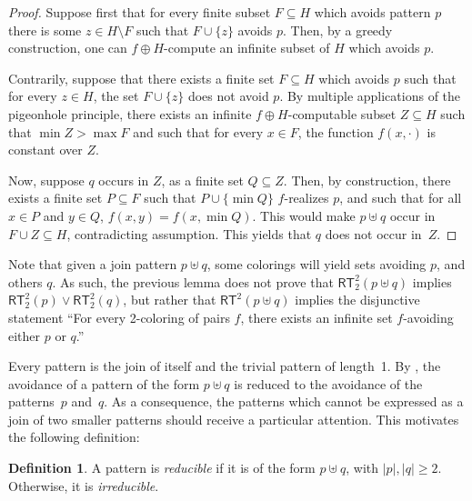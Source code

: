 \documentclass{article}
\newcommand{\RT}[0]{\mathsf{RT}}
\newcommand{\NN}[0]{\mathbb{N}}
\def\qt#1{``#1''}%
\def\NN{\mathbb{N}}
\def\qt#1{``#1''}%
\numberwithin{theorem}{section}
\newtheorem{lemma}[theorem]{Lemma}
\theoremstyle{definition}
\newtheorem{definition}[theorem]{Definition}
\begin{document}
\begin{proof}
Suppose first that for every finite subset $F \subseteq H$ which avoids pattern $p$ there is some $z \in H \setminus F$ such that $F \cup \{ z \}$ avoids $p$. Then, by a greedy construction, one can $f \oplus H$-compute an infinite subset of $H$ which avoids $p$.

Contrarily, suppose that there exists a finite set $F \subseteq H$ which avoids $p$ such that for every $z \in H$, the set $F \cup \{z \}$ does not avoid $p$. By multiple applications of the pigeonhole principle, there exists an infinite $f \oplus H$-computable subset $Z \subseteq H$ such that $\min Z > \max F$ and such that for every $x \in F$, the function $f(x, \cdot)$ is constant over $Z$.

Now, suppose $q$ occurs in $Z$, as a finite set $Q \subseteq Z$. Then, by construction, there exists a finite set $P \subseteq F$ such that $P \cup \{ \min Q \}$ $f$-realizes $p$, and such that for all $x \in P$ and $y \in Q$, $f(x,y) = f(x, \min Q)$. This would make $p \uplus q$ occur in $F \cup Z \subseteq H$, contradicting assumption. This yields that $q$ does not occur in~$Z$.
\end{proof}

Note that given a join pattern $p \uplus q$, some colorings will yield sets avoiding $p$, and others $q$. As such, the previous lemma does not prove that $\RT_2^2(p \uplus q)$ implies $\RT_2^2(p) \lor \RT_2^2(q)$, but rather that $\RT^2(p \uplus q)$ implies the disjunctive statement \qt{For every 2-coloring of pairs $f$, there exists an infinite set $f$-avoiding either $p$ or $q$.}

Every pattern is the join of itself and the trivial pattern of length~1. By , the avoidance of a pattern of the form $p \uplus q$ is reduced to the avoidance of the patterns~$p$ and~$q$. As a consequence, the patterns which cannot be expressed as a join of two smaller patterns should receive a particular attention. This motivates the following definition:

\begin{definition}
A pattern is \emph{reducible} if it is of the form $p \uplus q$, with $|p|, |q| \geq 2$.
Otherwise, it is \emph{irreducible}.
\end{definition}
\end{document}
